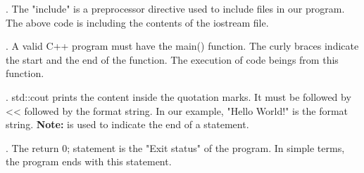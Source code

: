 \documentclass[11pt, a4paper]{article}
\begin{document}
. \newline
The "include" is a preprocessor directive used to include files in our
program. The above code is including the contents of the iostream file.

. \newline
A valid C++ program must have the main() function. The curly braces
indicate the start and the end of the function. \newline The execution of
code beings from this function.

. \newline
std::cout prints the content inside the quotation marks.
It must be followed by << followed by the format string. In our
example, "Hello World!" is the format string. \newline
\textbf{Note: } \fbox{;} is used to indicate the end of a statement.

. \newline
The return 0; statement is the "Exit status" of the program.
In simple terms, the program ends with this statement.
\end{document}
